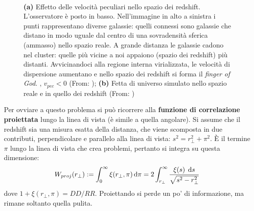 \begin{figure}[H]
    $\;\;$
    \caption{\textbf{(a)} Effetto delle velocità peculiari nello spazio dei redshift. L'osservatore è posto in basso. Nell'immagine in alto a sinistra i punti rappresentano diverse galassie: quelli connessi sono galassie che distano in modo uguale dal centro di una sovradensità sferica (ammasso) nello spazio reale. A grande distanza le galassie cadono nel cluster: quelle più vicine a noi appaiono (spazio dei redshift) più distanti. Avvicinandoci alla regione interna virializzata, le velocità di dispersione aumentano e nello spazio dei redshift si forma il \textit{finger of God}.  , $v_{pec} <0$ (From: \cite{Hamilton_1998}); \textbf{(b)} Fetta di universo simulato nello spazio reale e in quello dei redshift (From: \cite{Praton_1997})} \label{fig10:bella} 
\end{figure}

Per ovviare a questo problema si può ricorrere alla \textbf{funzione di correlazione proiettata} lungo la linea di vista (è simile a quella angolare). Si assume che il redshift sia una misura esatta della distanza, che viene scomposta in due contributi, perpendicolare e parallelo alla linea di vista: $s^2 =  r_\perp^2 + \pi^2$. È il termine $\pi$ lungo la linea di vista che crea problemi, pertanto si integra su questa dimensione:
\begin{equation}
    W_{proj}(r_\perp ):=\int_0^\infty \xi(r_\perp, \pi)\operatorname{d}\!{\pi}=2\int_{r_\perp}^\infty\frac{\xi(s)\;\operatorname{d}\!{s}}{\sqrt{s^2-r_\perp ^2}} 
\end{equation}
dove $1+\xi(r_\perp , \pi)= DD/RR$. Proiettando si perde un po' di informazione, ma rimane soltanto quella pulita.

